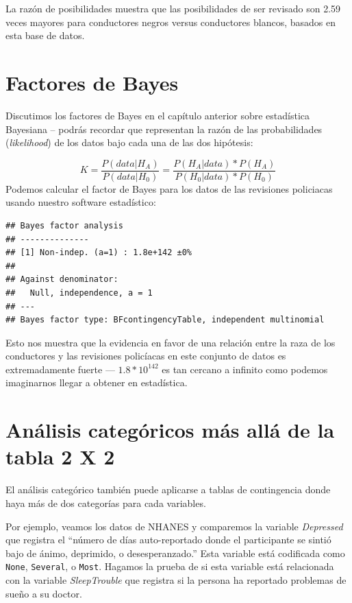 \documentclass[
  12pt,
]{book}
\begin{document}
La razón de posibilidades muestra que las posibilidades de ser revisado son 2.59 veces mayores para conductores negros versus conductores blancos, basados en esta base de datos.

\hypertarget{factores-de-bayes}{%
\section{Factores de Bayes}\label{factores-de-bayes}}

Discutimos los factores de Bayes en el capítulo anterior sobre estadística Bayesiana -- podrás recordar que representan la razón de las probabilidades (\emph{likelihood}) de los datos bajo cada una de las dos hipótesis:

\[ 
K = \frac{P(data|H_A)}{P(data|H_0)} = \frac{P(H_A|data)*P(H_A)}{P(H_0|data)*P(H_0)}
\]
Podemos calcular el factor de Bayes para los datos de las revisiones policiacas usando nuestro software estadístico:

\begin{verbatim}
## Bayes factor analysis
## --------------
## [1] Non-indep. (a=1) : 1.8e+142 ±0%
## 
## Against denominator:
##   Null, independence, a = 1 
## ---
## Bayes factor type: BFcontingencyTable, independent multinomial
\end{verbatim}

Esto nos muestra que la evidencia en favor de una relación entre la raza de los conductores y las revisiones policíacas en este conjunto de datos es extremadamente fuerte --- \(1.8 * 10^{142}\) es tan cercano a infinito como podemos imaginarnos llegar a obtener en estadística.

\hypertarget{anuxe1lisis-categuxf3ricos-muxe1s-alluxe1-de-la-tabla-2-x-2}{%
\section{Análisis categóricos más allá de la tabla 2 X 2}\label{anuxe1lisis-categuxf3ricos-muxe1s-alluxe1-de-la-tabla-2-x-2}}

El análisis categórico también puede aplicarse a tablas de contingencia donde haya más de dos categorías para cada variables.

Por ejemplo, veamos los datos de NHANES y comparemos la variable \emph{Depressed} que registra el ``número de días auto-reportado donde el participante se sintió bajo de ánimo, deprimido, o desesperanzado.'' Esta variable está codificada como \texttt{None}, \texttt{Several}, o \texttt{Most}. Hagamos la prueba de si esta variable está relacionada con la variable \emph{SleepTrouble} que registra si la persona ha reportado problemas de sueño a su doctor.
\end{document}
